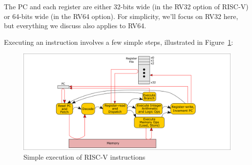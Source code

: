 The PC and each register are either 32-bits wide (in the RV32 option
of RISC-V) or 64-bits wide (in the RV64 option).  For simplicity,
we'll focus on RV32 here, but everything we discuss also applies to
RV64.

Executing an instruction involves a few simple steps, illustrated in
Figure~\ref{Fig_Simple_Instr_Exec}:
\begin{figure}[htbp]
  \centerline{\includegraphics[width=6in,angle=0]{ch030_RISCV_Design_Space/Figures/Fig_Simple_Instr_Exec}}
  \caption{\label{Fig_Simple_Instr_Exec}Simple execution of RISC-V instructions}
\end{figure}
